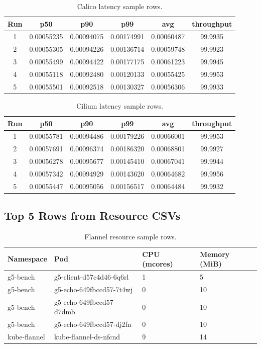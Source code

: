 \documentclass[12pt,a4paper]{article}
\begin{document}
\begin{table}[H]
\centering
\small
\caption{Calico latency sample rows.}
\begin{tabular}{cccccc}
\toprule
Run & p50 & p90 & p99 & avg & throughput \\
\midrule
1 & 0.00055235 & 0.00094075 & 0.00174991 & 0.00060487 & 99.9935 \\
2 & 0.00055305 & 0.00094226 & 0.00136714 & 0.00059748 & 99.9923 \\
3 & 0.00055499 & 0.00094422 & 0.00177175 & 0.00061223 & 99.9945 \\
4 & 0.00055118 & 0.00092480 & 0.00120133 & 0.00055425 & 99.9953 \\
5 & 0.00055501 & 0.00092518 & 0.00130327 & 0.00056306 & 99.9933 \\
\bottomrule
\end{tabular}
\end{table}

\begin{table}[H]
\centering
\small
\caption{Cilium latency sample rows.}
\begin{tabular}{cccccc}
\toprule
Run & p50 & p90 & p99 & avg & throughput \\
\midrule
1 & 0.00055781 & 0.00094486 & 0.00179226 & 0.00066001 & 99.9953 \\
2 & 0.00057691 & 0.00096374 & 0.00186320 & 0.00068801 & 99.9927 \\
3 & 0.00056278 & 0.00095677 & 0.00145410 & 0.00067041 & 99.9944 \\
4 & 0.00057342 & 0.00094929 & 0.00143620 & 0.00064682 & 99.9956 \\
5 & 0.00055447 & 0.00095056 & 0.00156517 & 0.00064484 & 99.9932 \\
\bottomrule
\end{tabular}
\end{table}

\subsection{Top 5 Rows from Resource CSVs}
\begin{table}[H]
\centering
\small
\caption{Flannel resource sample rows.}
\begin{tabular}{llll}
\toprule
Namespace & Pod & CPU (mcores) & Memory (MiB) \\
\midrule
g5-bench & g5-client-d57c4d46-6q6rl & 1 & 5 \\
g5-bench & g5-echo-649fbccd57-7t4wj & 0 & 10 \\
g5-bench & g5-echo-649fbccd57-d7dmb & 0 & 10 \\
g5-bench & g5-echo-649fbccd57-dj2fn & 0 & 10 \\
kube-flannel & kube-flannel-ds-nfcnd & 9 & 14 \\
\bottomrule
\end{tabular}
\end{table}
\end{document}
